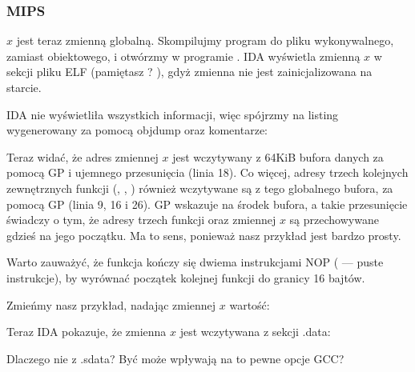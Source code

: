 \subsubsection{MIPS}


$x$ jest teraz zmienną globalną.
Skompilujmy program do pliku wykonywalnego, zamiast obiektowego, i otwórzmy w programie \IDA.
IDA wyświetla zmienną $x$ w sekcji  pliku ELF (pamiętasz ? ),
gdyż zmienna nie jest zainicjalizowana na starcie.



IDA nie wyświetliła wszystkich informacji, więc spójrzmy na listing wygenerowany za pomocą objdump oraz komentarze:



Teraz widać, że adres zmiennej $x$ jest wczytywany z 64KiB bufora danych za pomocą GP i ujemnego przesunięcia (linia 18).
Co więcej, adresy trzech kolejnych zewnętrznych funkcji (\puts, \scanf, \printf) również wczytywane są z tego globalnego bufora, za pomocą GP (linia 9, 16 i 26).
GP wskazuje na środek bufora, a takie przesunięcie świadczy o tym, że adresy trzech funkcji oraz zmiennej $x$ są przechowywane gdzieś na jego początku.
Ma to sens, ponieważ nasz przykład jest bardzo prosty.


Warto zauważyć, że funkcja kończy się dwiema instrukcjami \ac{NOP} ( --- puste instrukcje), by wyrównać początek kolejnej funkcji do granicy 16 bajtów.


Zmieńmy nasz przykład, nadając zmiennej $x$ wartość:



Teraz IDA pokazuje, że zmienna $x$ jest wczytywana z sekcji .data:



Dlaczego nie z .sdata? Być może wpływają na to pewne opcje GCC?

